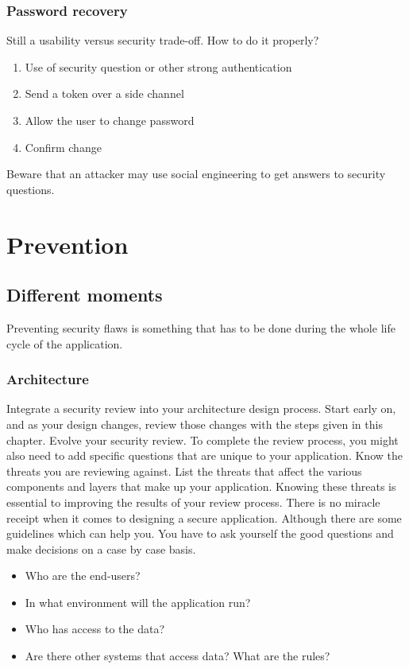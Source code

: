 \subsubsection*{Password recovery}
Still a usability versus security trade-off.
How to do it properly?
\begin{enumerate}
\item Use of security question or other strong authentication
\item Send a token over a side channel
\item Allow the user to change password
\item Confirm change
\end{enumerate}
Beware that an attacker may use social engineering to get answers to security
questions.

\section{Prevention}

\subsection{Different moments}

Preventing security flaws is something that has to be done during the
whole life cycle of the application.

\subsubsection{Architecture}

Integrate a security review into your architecture design process. Start
early on, and as your design changes, review those changes with the
steps given in this chapter.
Evolve your security review. To complete the review
process, you might also need to add specific questions that are unique
to your application.
Know the threats you are reviewing against. List the threats that affect the
various components and layers that make up your application.
Knowing these threats is essential to improving the results of your review process.
There is no miracle receipt when it comes to designing a secure
application. Although there are some guidelines which can help you. You
have to ask yourself the good questions and make decisions on a case by
case basis.

\begin{itemize}
\item Who are the end-users?
\item In what environment will the application run?
\item Who has access to the data?
\item Are there other systems that access data? What are the rules?
\end{itemize}

